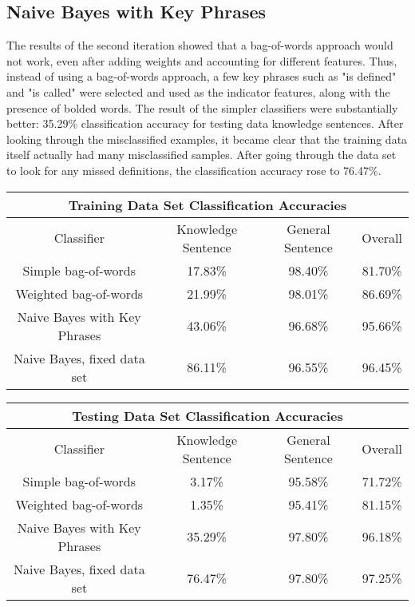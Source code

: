 \documentclass{article} %
\begin{document}
\subsection{Naive Bayes with Key Phrases}

The results of the second iteration showed that a bag-of-words approach would not work, even after adding weights and accounting for different features. Thus, instead of using a bag-of-words approach, a few key phrases such as "is defined" and "is called" were selected and used as the indicator features, along with the presence of bolded words. The result of the simpler classifiers were substantially better: 35.29\% classification accuracy for testing data knowledge sentences. After looking through the misclassified examples, it became clear that the training data itself actually had many misclassified samples. After going through the data set to look for any missed definitions, the classification accuracy rose to 76.47\%.

\begin{center}
\begin{tabular}{ |c||c|c|c| }
	\hline
	\multicolumn{4}{|c|}{Training Data Set Classification Accuracies} \\
	\hline
	Classifier & Knowledge Sentence & General Sentence & Overall \\
	\hline
	Simple bag-of-words & 17.83\% & 98.40\% & 81.70\% \\
	\hline
	Weighted bag-of-words & 21.99\% & 98.01\% & 86.69\% \\
	\hline
	Naive Bayes with Key Phrases & 43.06\% & 96.68\% & 95.66\% \\
	\hline
	Naive Bayes, fixed data set & 86.11\% & 96.55\% & 96.45\% \\
	\hline
\end{tabular}

\begin{tabular}{ |c||c|c|c| }
	\hline
	\multicolumn{4}{|c|}{Testing Data Set Classification Accuracies} \\
	\hline
	Classifier & Knowledge Sentence & General Sentence & Overall \\
	\hline
	Simple bag-of-words & 3.17\% & 95.58\% & 71.72\% \\
	\hline
	Weighted bag-of-words & 1.35\% & 95.41\% & 81.15\% \\
	\hline
	Naive Bayes with Key Phrases & 35.29\% & 97.80\% & 96.18\% \\
	\hline
	Naive Bayes, fixed data set & 76.47\% & 97.80\% & 97.25\% \\
	\hline
\end{tabular}
\end{center}
\end{document}
